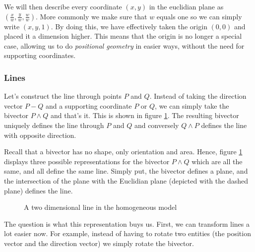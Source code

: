 \documentclass[10pt]{report}
\begin{document}
We will then describe every coordinate $(x, y)$ in the euclidian
plane as $(\frac{x}{w}, \frac{y}{w}, \frac{w}{w})$. More commonly
we make sure that $w$ equals one so we can simply write $(x, y,
1)$. By doing this, we have effectively taken the origin $(0, 0)$
and placed it a dimension higher. This means that the origin is no
longer a special case, allowing us to do \emph{positional
geometry} in easier ways, without the need for supporting
coordinates.

\subsubsection{Lines}

Let's construct the line through points $P$ and $Q$. Instead of
taking the direction vector $P-Q$ and a supporting coordinate $P$
or $Q$, we can simply take the bivector $P\wedge Q$ and that's it.
This is shown in figure \ref{fig:homogeneous line}. The resulting
bivector uniquely defines the line through $P$ and $Q$ and
conversely $Q\wedge P$ defines the line with opposite direction.

Recall that a bivector has no shape, only orientation and area.
Hence, figure \ref{fig:homogeneous line} displays three possible
representations for the bivector $P\wedge Q$ which are all the
same, and all define the same line. Simply put, the bivector
defines a plane, and the intersection of the plane with the
Euclidian plane (depicted with the dashed plane) defines the line.

\begin{figure}[ht]
\centering

\caption{A two dimensional line in the homogeneous model}
\label{fig:homogeneous line}
\end{figure}

The question is what this representation buys us. First, we can
transform lines a lot easier now. For example, instead of having
to rotate two entities (the position vector and the direction
vector) we simply rotate the bivector.
\end{document}
